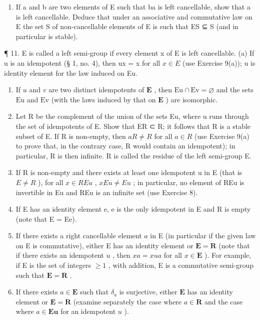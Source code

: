 \begin{enumerate}
\def\labelenumi{\arabic{enumi}.}
\setcounter{enumi}{9}
\tightlist
\item
  If a and b are two elements of E such that ba is left cancellable, show that a is left cancellable. Deduce that under an associative and commutative law on E the set S of non-cancellable elements of E is such that ES ⊆ S (and in particular is stable).
\end{enumerate}

¶ 11. E is called a left semi-group if every element x of E is left cancellable. (a) If u is an idempotent (§ 1, no. 4), then ux = x for all \(x \in E\) (use Exercise 9(a)); u is identity element for the law induced on Eu.

\begin{enumerate}
\def\labelenumi{(\alph{enumi})}
\setcounter{enumi}{1}
\item
  If \(u\) and \(v\) are two distinct idempotents of \(\mathbf{E}\) , then \(\mathrm{Eu} \cap \mathrm{Ev} = \varnothing\) and the sets \(\mathrm{Eu}\) and \(\mathrm{Ev}\) (with the laws induced by that on \(\mathbf{E}\) ) are isomorphic.
\item
  Let R be the complement of the union of the sets Eu, where u runs through the set of idempotents of E. Show that ER ⊂ R; it follows that R is a stable subset of E. If R is non-empty, then \(aR \neq R\) for all \(a \in R\) (use Exercise 9(a) to prove that, in the contrary case, R would contain an idempotent); in particular, R is then infinite. R is called the residue of the left semi-group E.
\item
  If R is non-empty and there exists at least one idempotent u in E (that is \(E \neq R\) ), for all \(x \in REu\) , \(xEu \neq Eu\) ; in particular, no element of REu is invertible in Eu and REu is an infinite set (use Exercise 8).
\item
  If E has an identity element e, e is the only idempotent in E and R is empty (note that E = Ee).
\item
  If there exists a right cancellable element \(a\) in E (in particular if the given law on E is commutative), either E has an identity element or \(\mathbf{E} = \mathbf{R}\) (note that if there exists an idempotent \(u\) , then \(xa = xua\) for all \(x \in \mathbf{E}\) ). For example, if E is the set of integers \(\geqslant 1\) , with addition, E is a commutative semi-group such that \(\mathbf{E} = \mathbf{R}\) .
\item
  If there exists \(a \in \mathbf{E}\) such that \(\delta_a\) is surjective, either \(\mathbf{E}\) has an identity element or \(\mathbf{E} = \mathbf{R}\) (examine separately the case where \(a \in \mathbf{R}\) and the case where \(a \in \mathbf{Eu}\) for an idempotent \(u\) ).
\end{enumerate}

